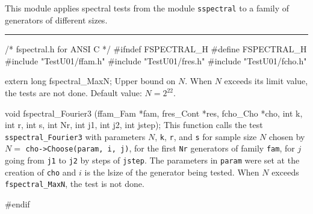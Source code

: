 
This module applies spectral tests from the module {\tt sspectral}
to a family of generators of different sizes.

\bigskip
\hrule
\code\hide
/* fspectral.h  for ANSI C */
#ifndef FSPECTRAL_H
#define FSPECTRAL_H
\endhide
#include "TestU01/ffam.h"
#include "TestU01/fres.h"
#include "TestU01/fcho.h"


extern long fspectral_MaxN;
\endcode
\tab
  Upper bound on $N$.
  When $N$ exceeds its limit value, the tests are not done.
  Default value: $N = 2^{22}$.
\endtab




\code
void fspectral_Fourier3 (ffam_Fam *fam, fres_Cont *res, fcho_Cho *cho,
                         int k, int r, int s,
                         int Nr, int j1, int j2, int jstep);
\endcode
\tab
 This function calls the test {\tt sspectral\_Fourier3} with parameters
 $N$, {\tt k}, {\tt r}, and {\tt s} for sample size $N$ chosen by
  $N = {}$ {\tt cho->Choose(param, i, j)},
 for the first {\tt Nr} generators of family {\tt fam}, for $j$ going from
 {\tt j1} to {\tt j2} by steps of {\tt jstep}. The parameters in {\tt param}
 were set at the creation of {\tt cho} and $i$ is the lsize of the
 generator being tested.
 When $N$ exceeds {\tt fspectral\_MaxN}, the test is not done.
\endtab

\code
\hide
#endif
\endhide
\endcode
